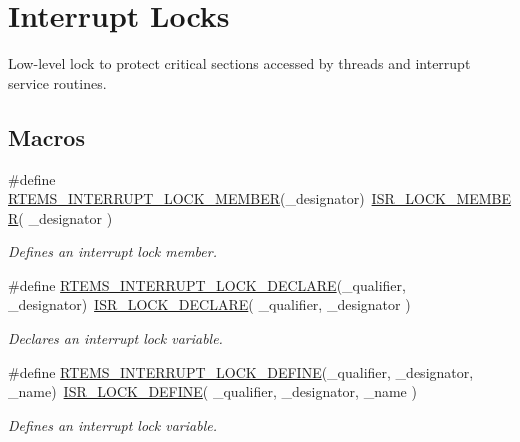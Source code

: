 \hypertarget{group__ClassicINTRLocks}{}\section{Interrupt Locks}
\label{group__ClassicINTRLocks}


Low-\/level lock to protect critical sections accessed by threads and interrupt service routines.  


\subsection*{Macros}
\begin{DoxyCompactItemize}
\item 
\#define \mbox{\hyperlink{group__ClassicINTRLocks_ga26826ac7bf02ef651e67c386443beb0f}{R\+T\+E\+M\+S\+\_\+\+I\+N\+T\+E\+R\+R\+U\+P\+T\+\_\+\+L\+O\+C\+K\+\_\+\+M\+E\+M\+B\+ER}}(\+\_\+designator)~\mbox{\hyperlink{group__RTEMSScoreISRLocks_ga09174e3121c9ec30b08d4ab09706833d}{I\+S\+R\+\_\+\+L\+O\+C\+K\+\_\+\+M\+E\+M\+B\+ER}}( \+\_\+designator )
\begin{DoxyCompactList}\small\item\em Defines an interrupt lock member. \end{DoxyCompactList}\item 
\#define \mbox{\hyperlink{group__ClassicINTRLocks_ga1b0d6816018ae5cf52ac7251446d560c}{R\+T\+E\+M\+S\+\_\+\+I\+N\+T\+E\+R\+R\+U\+P\+T\+\_\+\+L\+O\+C\+K\+\_\+\+D\+E\+C\+L\+A\+RE}}(\+\_\+qualifier,  \+\_\+designator)~\mbox{\hyperlink{group__RTEMSScoreISRLocks_ga6702456c1dc97f69ebbbf1438c2b7e2e}{I\+S\+R\+\_\+\+L\+O\+C\+K\+\_\+\+D\+E\+C\+L\+A\+RE}}( \+\_\+qualifier, \+\_\+designator )
\begin{DoxyCompactList}\small\item\em Declares an interrupt lock variable. \end{DoxyCompactList}\item 
\#define \mbox{\hyperlink{group__ClassicINTRLocks_gaf7c5b95057f189ae59add0a4efa06060}{R\+T\+E\+M\+S\+\_\+\+I\+N\+T\+E\+R\+R\+U\+P\+T\+\_\+\+L\+O\+C\+K\+\_\+\+D\+E\+F\+I\+NE}}(\+\_\+qualifier,  \+\_\+designator,  \+\_\+name)~\mbox{\hyperlink{group__RTEMSScoreISRLocks_ga24058ced522fcade5ccdc9bd477574f2}{I\+S\+R\+\_\+\+L\+O\+C\+K\+\_\+\+D\+E\+F\+I\+NE}}( \+\_\+qualifier, \+\_\+designator, \+\_\+name )
\begin{DoxyCompactList}\small\item\em Defines an interrupt lock variable. \end{DoxyCompactList}\item 

\end{DoxyCompactItemize}
